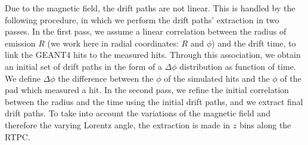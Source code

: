 Due to the magnetic field, the drift paths are not linear. This is handled by 
the following procedure, in which we perform the drift paths' extraction in 
two passes. In the first pass, we assume a linear correlation between the 
radius of emission $R$ (we work here in radial coordinates: $R$ and $\phi$) and the 
drift time, to link the GEANT4 hits to the measured hits. Through this association, we obtain an 
initial set of drift paths in the form of a $\Delta \phi$ distribution as function of time. We define $\Delta \phi$ the 
difference between the $\phi$ of the simulated hits and the $\phi$ of the pad 
which measured a hit. In the second pass, we refine the initial 
correlation between the radius and the time using the initial drift paths, and 
we extract final drift paths. To take into account the variations of the magnetic 
field and therefore the varying Lorentz angle, the extraction 
is made in $z$ bins along the RTPC. 

